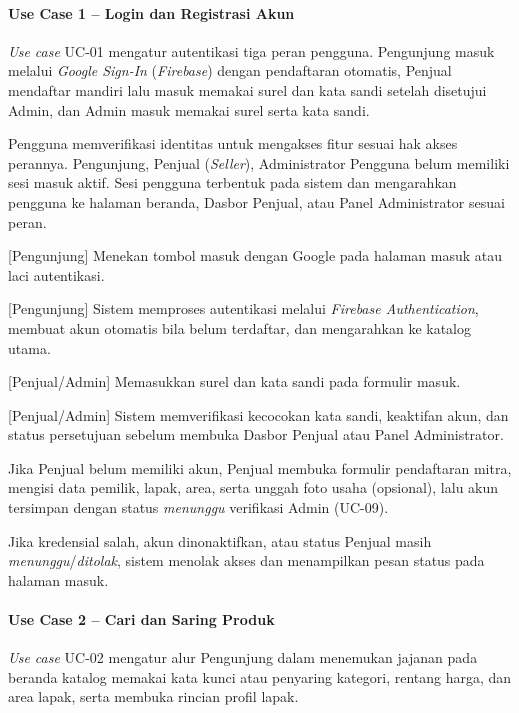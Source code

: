 \paragraph{Use Case 1 -- Login dan Registrasi Akun}
\textit{Use case} UC-01 mengatur autentikasi tiga peran pengguna. Pengunjung masuk melalui \textit{Google Sign-In} (\textit{Firebase}) dengan pendaftaran otomatis, Penjual mendaftar mandiri lalu masuk memakai surel dan kata sandi setelah disetujui Admin, dan Admin masuk memakai surel serta kata sandi.

{Pengguna memverifikasi identitas untuk mengakses fitur sesuai hak akses perannya.}
{Pengunjung, Penjual (\textit{Seller}), Administrator}
{Pengguna belum memiliki sesi masuk aktif.}
{Sesi pengguna terbentuk pada sistem dan mengarahkan pengguna ke halaman beranda, Dasbor Penjual, atau Panel Administrator sesuai peran.}
{\begin{uclist}
  \item {[Pengunjung]} Menekan tombol masuk dengan Google pada halaman masuk atau laci autentikasi.
  \item {[Pengunjung]} Sistem memproses autentikasi melalui \textit{Firebase Authentication}, membuat akun otomatis bila belum terdaftar, dan mengarahkan ke katalog utama.
  \item {[Penjual/Admin]} Memasukkan surel dan kata sandi pada formulir masuk.
  \item {[Penjual/Admin]} Sistem memverifikasi kecocokan kata sandi, keaktifan akun, dan status persetujuan sebelum membuka Dasbor Penjual atau Panel Administrator.
\end{uclist}}
{\begin{ucbullet}
  \item Jika Penjual belum memiliki akun, Penjual membuka formulir pendaftaran mitra, mengisi data pemilik, lapak, area, serta unggah foto usaha (opsional), lalu akun tersimpan dengan status \textit{menunggu} verifikasi Admin (UC-09).
  \item Jika kredensial salah, akun dinonaktifkan, atau status Penjual masih \textit{menunggu}/\textit{ditolak}, sistem menolak akses dan menampilkan pesan status pada halaman masuk.
\end{ucbullet}}

\paragraph{Use Case 2 -- Cari dan Saring Produk}
\textit{Use case} UC-02 mengatur alur Pengunjung dalam menemukan jajanan pada beranda katalog memakai kata kunci atau penyaring kategori, rentang harga, dan area lapak, serta membuka rincian profil lapak.

